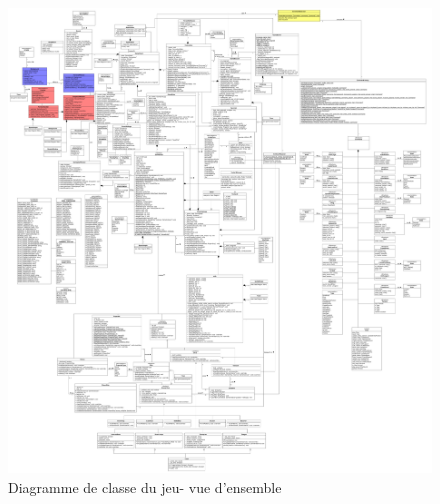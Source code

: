 \documentclass[french]{article}
\begin{document}
\begin{figure}[!htbp]
    \centering
    \includegraphics[scale=0.11, angle=90]{class_diagram/class_diagramm_game.png}
    \caption{Diagramme de classe du jeu- vue d'ensemble}
    \label{class diagram:game-gameplay}
\end{figure}

\restoregeometry
\end{document}
